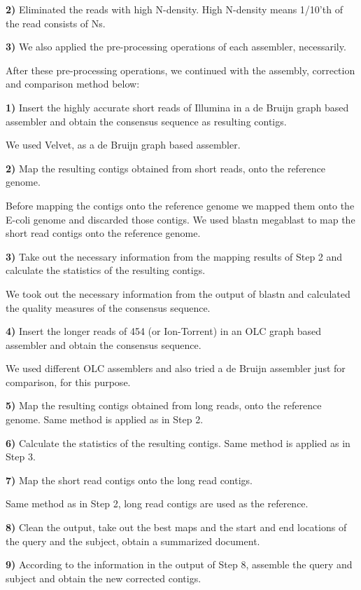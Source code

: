 \documentclass[12pt]{article}
\begin{document}
\textbf{2)} Eliminated the reads with high N-density. High N-density means 1/10'th of the read consists of Ns. 

\textbf{3)} We also applied the pre-processing operations of each assembler, necessarily.

After these pre-processing operations, we continued with the assembly, correction and comparison method below:

\textbf{1)} Insert the highly accurate short reads of Illumina in a de Bruijn graph based assembler and obtain the consensus sequence as resulting contigs.

We used Velvet\cite{velvetZerbino:2008}, as a de Bruijn graph based assembler.

\textbf{2)} Map the resulting contigs obtained from short reads, onto the reference genome. 

Before mapping the contigs onto the reference genome we mapped them onto the E-coli genome and discarded those contigs. We used blastn megablast \cite{blast} to map the short read contigs onto the reference genome.

\textbf{3)} Take out the necessary information from the mapping results of Step 2 and calculate the statistics of the resulting contigs.

We took out the necessary information from the output of blastn and calculated the quality measures of the consensus sequence.

\textbf{4)} Insert the longer reads of 454 (or Ion-Torrent) in an OLC graph based assembler and obtain the consensus sequence.

We used different OLC assemblers \cite{celera:2000,sga:2012} and also tried a de Bruijn assembler \cite{spadesBankevich:2012} just for comparison, for this purpose.

\textbf{5)} Map the resulting contigs obtained from long reads, onto the reference genome. Same method is applied as in Step 2.

\textbf{6)} Calculate the statistics of the resulting contigs. Same method is applied as in Step 3.

\textbf{7)} Map the short read contigs onto the long read contigs. 

Same method as in Step 2, long read contigs are used as the reference.

\textbf{8)} Clean the output, take out the best maps and the start and end locations of the query and the subject, obtain a summarized document.

\textbf{9)} According to the information in the output of Step 8, assemble the query and subject and obtain the new corrected contigs.
\end{document}
